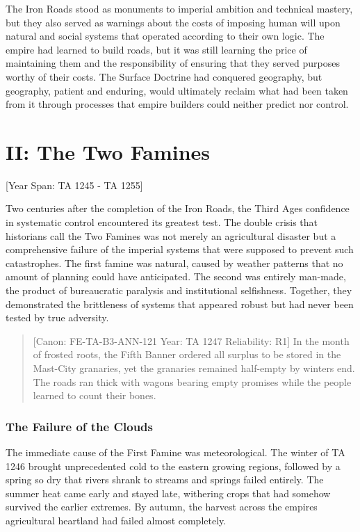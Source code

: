 The Iron Roads stood as monuments to imperial ambition and technical
mastery, but they also served as warnings about the costs of imposing
human will upon natural and social systems that operated according to
their own logic. The empire had learned to build roads, but it was still
learning the price of maintaining them and the responsibility of
ensuring that they served purposes worthy of their costs. The Surface
Doctrine had conquered geography, but geography, patient and enduring,
would ultimately reclaim what had been taken from it through processes
that empire builders could neither predict nor control.

\chapter{II: The Two Famines}\label{arc-ii-the-two-famines}

{[}Year Span: TA 1245 - TA 1255{]}

Two centuries after the completion of the Iron Roads, the Third
Age\textquotesingle s confidence in systematic control encountered its
greatest test. The double crisis that historians call the Two Famines
was not merely an agricultural disaster but a comprehensive failure of
the imperial systems that were supposed to prevent such catastrophes.
The first famine was natural, caused by weather patterns that no amount
of planning could have anticipated. The second was entirely man-made,
the product of bureaucratic paralysis and institutional selfishness.
Together, they demonstrated the brittleness of systems that appeared
robust but had never been tested by true adversity.

\begin{quote}
{[}Canon: FE-TA-B3-ANN-121 \textbar{} Year: TA 1247 \textbar{}
Reliability: R1{]} In the month of frosted roots, the Fifth Banner
ordered all surplus to be stored in the Mast-City granaries, yet the
granaries remained half-empty by winter\textquotesingle s end. The roads
ran thick with wagons bearing empty promises while the people learned to
count their bones.
\end{quote}

\subsection{The Failure of the Clouds}\label{the-failure-of-the-clouds}

The immediate cause of the First Famine was meteorological. The winter
of TA 1246 brought unprecedented cold to the eastern growing regions,
followed by a spring so dry that rivers shrank to streams and springs
failed entirely. The summer heat came early and stayed late, withering
crops that had somehow survived the earlier extremes. By autumn, the
harvest across the empire\textquotesingle s agricultural heartland had
failed almost completely.

